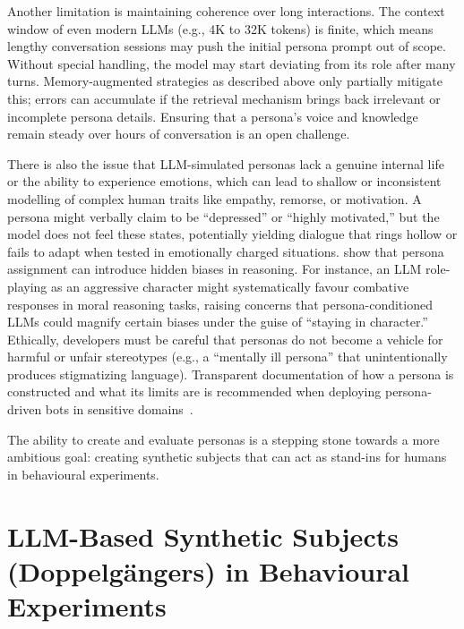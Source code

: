 Another limitation is maintaining coherence over long interactions. The context window of even modern LLMs (e.g., 4K to 32K tokens) is finite, which means lengthy conversation sessions may push the initial persona prompt out of scope. Without special handling, the model may start deviating from its role after many turns. Memory-augmented strategies as described above only partially mitigate this; errors can accumulate if the retrieval mechanism brings back irrelevant or incomplete persona details. Ensuring that a persona's voice and knowledge remain steady over hours of conversation is an open challenge.

There is also the issue that LLM-simulated personas lack a genuine internal life or the ability to experience emotions, which can lead to shallow or inconsistent modelling of complex human traits like empathy, remorse, or motivation. A persona might verbally claim to be ``depressed'' or ``highly motivated,'' but the model does not feel these states, potentially yielding dialogue that rings hollow or fails to adapt when tested in emotionally charged situations. \citet{gupta-etal-2024-sociodemographic} show that persona assignment can introduce hidden biases in reasoning. For instance, an LLM role-playing as an aggressive character might systematically favour combative responses in moral reasoning tasks, raising concerns that persona-conditioned LLMs could magnify certain biases under the guise of ``staying in character.'' Ethically, developers must be careful that personas do not become a vehicle for harmful or unfair stereotypes (e.g., a “mentally ill persona” that unintentionally produces stigmatizing language). Transparent documentation of how a persona is constructed and what its limits are is recommended when deploying persona-driven bots in sensitive domains~\cite{wu2025personastalksrevisitingimpact}.

The ability to create and evaluate personas is a stepping stone towards a more ambitious goal: creating synthetic subjects that can act as stand-ins for humans in behavioural experiments.




\section{LLM-Based Synthetic Subjects (Doppelgängers) in Behavioural Experiments}
\label{sec:background_synthetic_validation}

